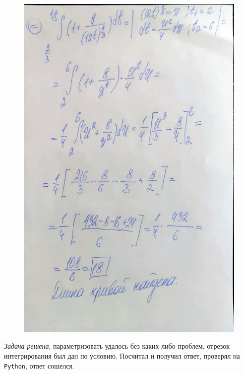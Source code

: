 \documentclass[a4paper,12pt]{article}
\begin{document}
\begin{figure}[H]
    \centering
    \includegraphics[width=0.9\linewidth]{../img/5_3.jpg}
    \label{fig:integral}
\end{figure}
\emph{Задача решена}, параметризовать удалось без каких-либо проблем, отрезок интегрирования
был дан по условию. Посчитал и получил ответ, проверял на \verb|Python|, ответ сошелся.
\end{document}
